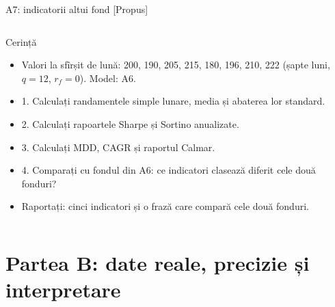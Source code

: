 \begin{frame}{A7: indicatorii altui fond [Propus]}
\propsub
\itemsize{\footnotesize}
\begin{columns}[T]
\begin{column}{\taskw}
\begin{block}{Cerință}
\begin{itemize}
    \item Valori la sfîrșit de lună: 200, 190, 205, 215, 180, 196, 210, 222 (șapte luni, $q = 12$, $r_f = 0$). Model: A6.
    \item 1. Calculați randamentele simple lunare, media și abaterea lor standard.
    \item 2. Calculați rapoartele Sharpe și Sortino anualizate.
    \item 3. Calculați MDD, CAGR și raportul Calmar.
    \item 4. Comparați cu fondul din A6: ce indicatori clasează diferit cele două fonduri?
    \item Raportați: cinci indicatori și o frază care compară cele două fonduri.
\end{itemize}
\end{block}
\end{column}
\begin{column}{\solw}
\end{column}
\end{columns}
\end{frame}


\section{Partea B: date reale, precizie și interpretare}

